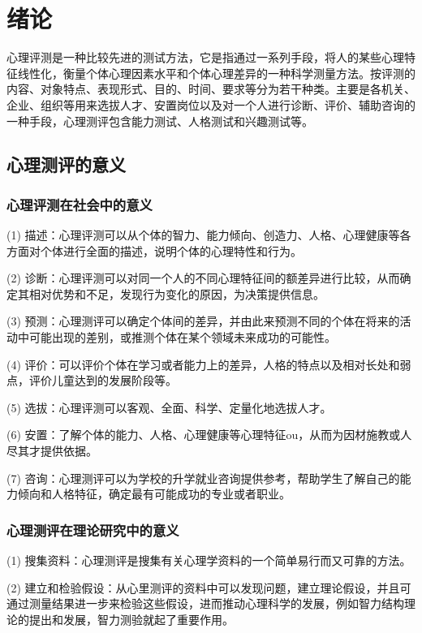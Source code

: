 \section{绪论}

心理评测是一种比较先进的测试方法，它是指通过一系列手段，将人的某些心理特征线性化，衡量个体心理因素水平和个体心理差异的一种科学测量方法。按评测的内容、对象特点、表现形式、目的、时间、要求等分为若干种类。主要是各机关、企业、组织等用来选拔人才、安置岗位以及对一个人进行诊断、评价、辅助咨询的一种手段，心理测评包含能力测试、人格测试和兴趣测试等。

\subsection{心理测评的意义}

\subsubsection{心理评测在社会中的意义}

(1) 描述：心理评测可以从个体的智力、能力倾向、创造力、人格、心理健康等各方面对个体进行全面的描述，说明个体的心理特性和行为。

(2) 诊断：心理评测可以对同一个人的不同心理特征间的额差异进行比较，从而确定其相对优势和不足，发现行为变化的原因，为决策提供信息。 

(3) 预测：心理测评可以确定个体间的差异，并由此来预测不同的个体在将来的活动中可能出现的差别，或推测个体在某个领域未来成功的可能性。 

(4) 评价：可以评价个体在学习或者能力上的差异，人格的特点以及相对长处和弱点，评价儿童达到的发展阶段等。 

(5) 选拔：心理评测可以客观、全面、科学、定量化地选拔人才。 

(6) 安置：了解个体的能力、人格、心理健康等心理特征ou，从而为因材施教或人尽其才提供依据。 

(7) 咨询：心理测评可以为学校的升学就业咨询提供参考，帮助学生了解自己的能力倾向和人格特征，确定最有可能成功的专业或者职业。 

\subsubsection{心理测评在理论研究中的意义}

(1) 搜集资料：心理测评是搜集有关心理学资料的一个简单易行而又可靠的方法。

(2) 建立和检验假设：从心里测评的资料中可以发现问题，建立理论假设，并且可通过测量结果进一步来检验这些假设，进而推动心理科学的发展，例如智力结构理论的提出和发展，智力测验就起了重要作用。

